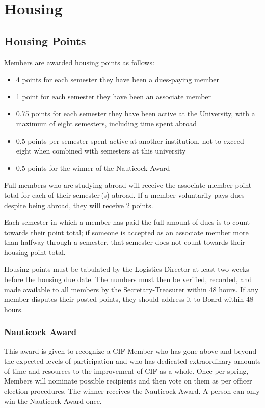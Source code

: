\section{Housing}
\label{sec:housing}



	\subsection{Housing Points}

	Members are awarded housing points as follows:
	\begin{itemize}
		\item 4 points for each semester they have been a dues-paying member
		\item 1 point for each semester they have been an associate member
		\item 0.75 points for each semester they have been active at the University, with a maximum of eight semesters, including time spent abroad
		\item 0.5 points per semester spent active at another institution, not to exceed eight when combined with semesters at this university
		\item 0.5 points for the winner of the Nauticock Award
	\end{itemize}

	Full members who are studying abroad will receive the associate member point total for each of their semester\,(s) abroad. If a member voluntarily pays dues despite being abroad, they will receive 2 points.

	Each semester in which a member has paid the full amount of dues is to count towards their point total; if someone is accepted as an associate member more than halfway through a semester, that semester does not count towards their housing point total.

	Housing points must be tabulated by the Logistics Director at least two weeks before the housing due date. The numbers must then be verified, recorded, and made available to all members by the Secretary-Treasurer within 48 hours. If any member disputes their posted points, they should address it to Board within 48 hours.



		\subsubsection{Nauticock Award}

		This award is given to recognize a CIF Member who has gone above and beyond the expected levels of participation and who has dedicated extraordinary amounts of time and resources to the improvement of CIF as a whole. Once per spring, Members will nominate possible recipients and then vote on them as per officer election procedures. The winner receives the Nauticock Award. A person can only win the Nauticock Award once.




